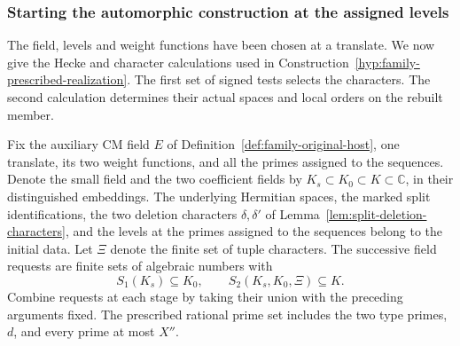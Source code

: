 \subsubsection*{Starting the automorphic construction at the assigned levels}
\label{subsec:automorphic-realization}
\hypertarget{source-automorphic-realization}{}

The field, levels and weight functions have been chosen at a translate. We now give the Hecke and character calculations used in Construction~\ref{hyp:family-prescribed-realization}. The first set of signed tests selects the characters. The second calculation determines their actual spaces and local orders on the rebuilt member.

\begin{paramdefinition}\label{hyp:initial-adelic-frame}
Fix the auxiliary CM field \(E\) of Definition~\ref{def:family-original-host},
one translate, its two weight functions, and all the
primes assigned to the sequences. Denote the small field and the two coefficient
fields by \(K_s\subset K_0\subset K\subset\mathbb C\), in
their distinguished embeddings. The underlying Hermitian spaces,
the marked split identifications, the two deletion characters
\(\delta,\delta'\) of Lemma~\ref{lem:split-deletion-characters}, and the levels at the primes assigned to the sequences belong to the initial data.
Let \(\Xi\) denote the finite set of tuple characters. The successive field requests are finite sets of algebraic numbers with
\[
 S_1(K_s)\subseteq K_0,\qquad S_2(K_s,K_0,\Xi)\subseteq K .
\] Combine requests at each stage by taking their union with the preceding arguments fixed. The prescribed rational prime set includes the two type primes, \(d\), and every prime at most \(X''\).
\end{paramdefinition}


